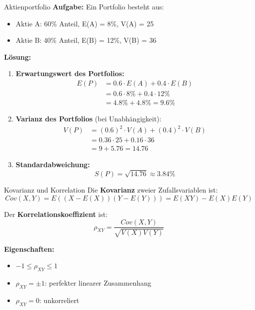 \begin{example2}{Aktienportfolio}
\textbf{Aufgabe:} Ein Portfolio besteht aus:
\begin{itemize}
\item Aktie A: 60\% Anteil, E(A) = 8\%, V(A) = 25
\item Aktie B: 40\% Anteil, E(B) = 12\%, V(B) = 36
\end{itemize}

\textbf{Lösung:}
\begin{enumerate}
\item \textbf{Erwartungswert des Portfolios:}
   \begin{align*}
   E(P) &= 0.6 \cdot E(A) + 0.4 \cdot E(B) \\
   &= 0.6 \cdot 8\% + 0.4 \cdot 12\% \\
   &= 4.8\% + 4.8\% = 9.6\%
   \end{align*}

\item \textbf{Varianz des Portfolios} (bei Unabhängigkeit):
   \begin{align*}
   V(P) &= (0.6)^2 \cdot V(A) + (0.4)^2 \cdot V(B) \\
   &= 0.36 \cdot 25 + 0.16 \cdot 36 \\
   &= 9 + 5.76 = 14.76
   \end{align*}

\item \textbf{Standardabweichung:}
   $$S(P) = \sqrt{14.76} \approx 3.84\%$$
\end{enumerate}
\end{example2}

\begin{definition}{Kovarianz und Korrelation}
Die \textbf{Kovarianz} zweier Zufallsvariablen ist:
$$Cov(X,Y) = E((X-E(X))(Y-E(Y))) = E(XY) - E(X)E(Y)$$

Der \textbf{Korrelationskoeffizient} ist:
$$\rho_{XY} = \frac{Cov(X,Y)}{\sqrt{V(X)V(Y)}}$$

\textbf{Eigenschaften:}
\begin{itemize}
    \item $-1 \leq \rho_{XY} \leq 1$
    \item $\rho_{XY} = \pm 1$: perfekter linearer Zusammenhang
    \item $\rho_{XY} = 0$: unkorreliert
\end{itemize}
\end{definition}

